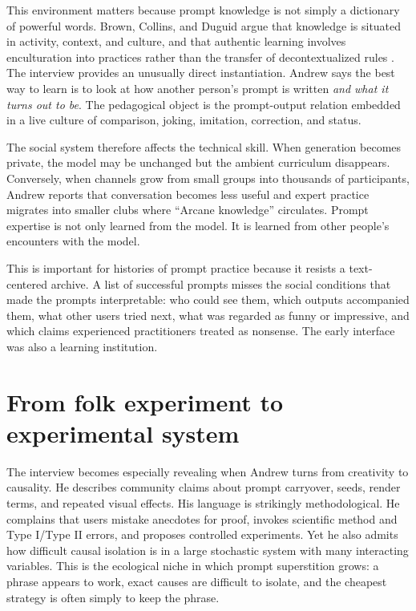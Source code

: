 \documentclass[11pt]{article}
\begin{document}
This environment matters because prompt knowledge is not simply a dictionary of powerful words. Brown, Collins, and Duguid argue that knowledge is situated in activity, context, and culture, and that authentic learning involves enculturation into practices rather than the transfer of decontextualized rules \citep{brown1989situated}. The interview provides an unusually direct instantiation. Andrew says the best way to learn is to look at how another person's prompt is written \emph{and what it turns out to be}. The pedagogical object is the prompt-output relation embedded in a live culture of comparison, joking, imitation, correction, and status.

The social system therefore affects the technical skill. When generation becomes private, the model may be unchanged but the ambient curriculum disappears. Conversely, when channels grow from small groups into thousands of participants, Andrew reports that conversation becomes less useful and expert practice migrates into smaller clubs where ``Arcane knowledge'' circulates. Prompt expertise is not only learned from the model. It is learned from other people's encounters with the model.

This is important for histories of prompt practice because it resists a text-centered archive. A list of successful prompts misses the social conditions that made the prompts interpretable: who could see them, which outputs accompanied them, what other users tried next, what was regarded as funny or impressive, and which claims experienced practitioners treated as nonsense. The early interface was also a learning institution.

\section{From folk experiment to experimental system}
The interview becomes especially revealing when Andrew turns from creativity to causality. He describes community claims about prompt carryover, seeds, render terms, and repeated visual effects. His language is strikingly methodological. He complains that users mistake anecdotes for proof, invokes scientific method and Type I/Type II errors, and proposes controlled experiments. Yet he also admits how difficult causal isolation is in a large stochastic system with many interacting variables. This is the ecological niche in which prompt superstition grows: a phrase appears to work, exact causes are difficult to isolate, and the cheapest strategy is often simply to keep the phrase.
\end{document}
